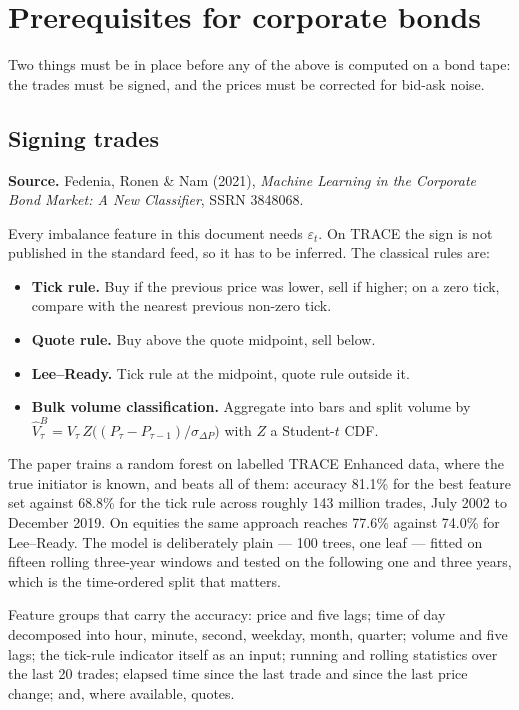 \documentclass[11pt]{article}
\begin{document}
\section{Prerequisites for corporate bonds}\label{sec:bonds}

Two things must be in place before any of the above is computed on a bond tape:
the trades must be signed, and the prices must be corrected for bid-ask noise.

\subsection{Signing trades}

\textbf{Source.} Fedenia, Ronen \& Nam (2021), \emph{Machine Learning in the
Corporate Bond Market: A New Classifier}, SSRN 3848068.

Every imbalance feature in this document needs $\varepsilon_t$. On TRACE the
sign is not published in the standard feed, so it has to be inferred. The
classical rules are:

\begin{itemize}[leftmargin=2em,itemsep=1pt]
\item \textbf{Tick rule.} Buy if the previous price was lower, sell if higher;
on a zero tick, compare with the nearest previous non-zero tick.
\item \textbf{Quote rule.} Buy above the quote midpoint, sell below.
\item \textbf{Lee--Ready.} Tick rule at the midpoint, quote rule outside it.
\item \textbf{Bulk volume classification.} Aggregate into bars and split volume
by $\hat V^{B}_{\tau}=V_{\tau}\,Z\bigl((P_{\tau}-P_{\tau-1})/\sigma_{\Delta P}\bigr)$
with $Z$ a Student-$t$ CDF.
\end{itemize}

The paper trains a random forest on labelled TRACE Enhanced data, where the true
initiator is known, and beats all of them: accuracy 81.1\% for the best feature
set against 68.8\% for the tick rule across roughly 143 million trades, July
2002 to December 2019. On equities the same approach reaches 77.6\% against
74.0\% for Lee--Ready. The model is deliberately plain --- 100 trees, one leaf
--- fitted on fifteen rolling three-year windows and tested on the following one
and three years, which is the time-ordered split that matters.

Feature groups that carry the accuracy: price and five lags; time of day
decomposed into hour, minute, second, weekday, month, quarter; volume and five
lags; the tick-rule indicator itself as an input; running and rolling
statistics over the last 20 trades; elapsed time since the last trade and since
the last price change; and, where available, quotes.
\end{document}
